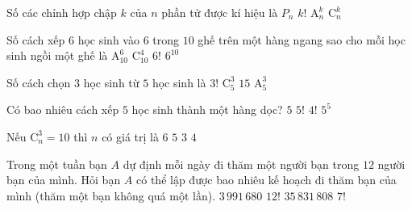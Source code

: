 \begin{ex}%
	Số các chỉnh hợp chập $k$ của $n$ phần tử được kí hiệu là 
	 \choice
		{$P_{n}$} 
		{$k!$} 
		 {\True $\mathrm{A}_{n}^{k}$}
		{$\mathrm{C}_{n}^{k}$} 
\end{ex}

\begin{ex}%
	Số cách xếp $6$ học sinh vào $6$ trong $10$ ghế trên một hàng  ngang sao cho mỗi học sinh ngồi một ghế là
	\choice 
		 {\True $\mathrm{A}_{10}^6$}
		{$\mathrm{C}_{10}^4$} 
		 {$6!$}
		{$6^{10}$} 
\end{ex}

\begin{ex}%
	Số cách chọn $3$ học sinh từ $5$ học  sinh là
	 \choice
		 {$3!$}
		{\True  $\mathrm{C}_5^3$}
		 {$15$}
		 {$\mathrm{A}_5^3$}
\end{ex}

\begin{ex}%
	Có bao nhiêu cách xếp $5$ học  sinh thành một hàng dọc?
	 \choice
		{$5$} 
		{\True $5!$} 
		 {$4!$}
		 {$5^5$}
\end{ex}

\begin{ex}%
	Nếu $\mathrm{C}_n^3=10$ thì $n$ có giá  trị là
	 \choice
		{$6$} 
		{\True  $5$}
		 {$3$}
		 {$4$}
\end{ex}

\begin{ex}%
	Trong một tuần bạn $A$ dự định mỗi ngày đi thăm một người bạn trong $12$ người  bạn của mình. Hỏi bạn $A$ có thể lập được bao nhiêu kế hoạch đi thăm bạn của mình (thăm một bạn không quá một lần).
	\choice 
		 {\True $3\,991\,680$}
		{$12!$} 
		{$35\,831\,808$} 
		 {$7!$}
\end{ex}

